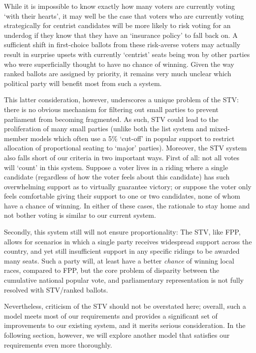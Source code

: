 \documentclass[DIV=calc, paper=a4, fontsize=11pt, twocolumn]{scrartcl}	 %
\begin{document}
While it is impossible to know exactly how many voters are currently voting `with their hearts', it may well be the case that voters who are currently voting strategically for centrist candidates will be more likely to risk voting for an underdog if they know that they have an `insurance policy' to fall back on. 
A sufficient shift in first-choice ballots from these risk-averse voters may actually result in surprise upsets with currently `centrist' seats being won by other parties who were superficially thought to have no chance of winning. Given the way ranked ballots are assigned by priority, it remains very much unclear which political party will benefit most from such a system. 

This latter consideration, however, underscores a unique problem of the STV:  there is no obvious mechanism for filtering out small parties to prevent parliament from becoming fragmented. As such, STV could lead to the proliferation of many small parties
(unlike both the list system and  mixed-member models which often use a 5\% `cut-off' in popular support to restrict allocation of proportional seating to `major' parties). 
Moreover, the STV system also falls short of our criteria in two important ways.
First of all: not all votes will `count' in this system. Suppose a voter lives in a riding where a single candidate (regardless of how the voter feels about this candidate) has such overwhelming support as to virtually guarantee victory; or suppose the voter only feels comfortable giving their support to one or two candidates, none of whom have a chance of winning. In either of these cases, the rationale to stay home and not bother voting is similar to our current system. 

Secondly, this system still will not ensure proportionality: The STV, like FPP, allows for scenarios in which a single party receives widespread support across the country, and yet still insufficient support in any specific ridings to be awarded many seats. Such a party will, at least have a better \emph{chance} of winning local races, compared to FPP, but the core problem of disparity between the cumulative national popular vote, and parliamentary representation is not fully resolved with STV/ranked ballots.

Nevertheless, criticism of the STV should not be overstated here; 
overall, such a model meets most of our requirements and provides a significant set of improvements to our existing system, and it merits serious consideration. In the following section, however, we will explore another model that satisfies our requirements even more thoroughly.
\end{document}
